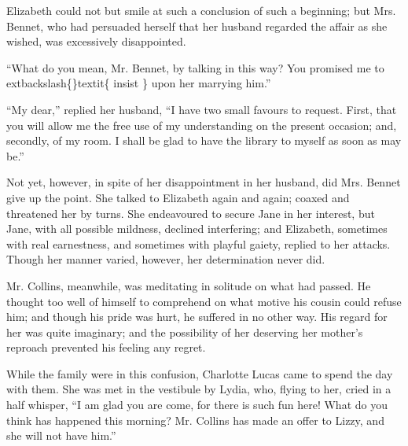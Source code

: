 \documentclass[10pt]{book}
\begin{document}
   Elizabeth could not but smile at such a conclusion of such a beginning;
but Mrs. Bennet, who had persuaded herself that her husband regarded the
affair as she wished, was excessively disappointed.
  

   “What do you mean, Mr. Bennet, by talking in this way? You promised me
to
   	extbackslash\{\}textit\{
    insist
   \}
   upon her marrying him.”
  

   “My dear,” replied her husband, “I have two small favours to request.
First, that you will allow me the free use of my understanding on the
present occasion; and, secondly, of my room. I shall be glad to have the
library to myself as soon as may be.”
  

   Not yet, however, in spite of her disappointment in her husband, did
Mrs. Bennet give up the point. She talked to Elizabeth again and again;
coaxed and threatened her by turns. She endeavoured to secure Jane in
her interest, but Jane, with all possible mildness, declined
interfering; and Elizabeth, sometimes with real earnestness, and
sometimes with playful gaiety, replied to her attacks. Though her manner
varied, however, her determination never did.
  

   Mr. Collins, meanwhile, was meditating in solitude on what had passed.
He thought too well of himself to comprehend on what motive his cousin
could refuse him; and though his pride was hurt, he suffered in no other
way. His regard for her was quite imaginary; and the possibility of her
deserving her mother’s reproach prevented his feeling any regret.
  

   While the family were in this confusion, Charlotte Lucas came to spend
the day with them. She was met in the vestibule by Lydia, who, flying to
her, cried in a half whisper, “I am glad you are come, for there is such
fun here! What do you think has happened this
   morning? Mr. Collins has
made an offer to Lizzy, and she will not have him.”
  
\end{document}
